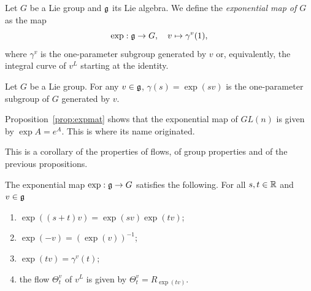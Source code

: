 \begin{definition}
	Let $G$ be a Lie group and $\mathfrak{g}$ its Lie algebra.
	We define the \emph{exponential map of $G$} as the map
	\begin{equation}
		\exp: \mathfrak{g} \to G , \quad v \mapsto \gamma^v(1),
	\end{equation}
	where $\gamma^v$ is the one-parameter subgroup generated by $v$ or, equivalently, the integral curve of $v^L$ starting at the identity.
\end{definition}

\begin{exercise}
	Let $G$ be a Lie group. For any $v\in\mathfrak{g}$, $\gamma(s) =\exp(sv)$ is the one-parameter subgroup of $G$ generated by $v$.
\end{exercise}

\begin{example}
	Proposition~\ref{prop:expmat} shows that the exponential map of $GL(n)$ is given by $\exp A = e^A$.
	This is where its name originated.
\end{example}

This is a corollary of the properties of flows, of group properties and of the previous propositions.
\begin{proposition}
	The exponential map $\exp: \mathfrak{g} \to G$ satisfies the following.
	For all $s,t\in\mathbb{R}$ and $v\in\mathfrak{g}$
	\begin{enumerate}
		\item $\exp((s+t)v) = \exp(sv)\exp(tv)$;
		\item $\exp(-v) = (\exp(v))^{-1}$;
		\item $\exp(tv) =\gamma^v(t)$;
		\item the flow $\Theta_t^v$ of $v^L$ is given by $\Theta_t^v=R_{\exp(tv)}$.
	\end{enumerate}
\end{proposition}

